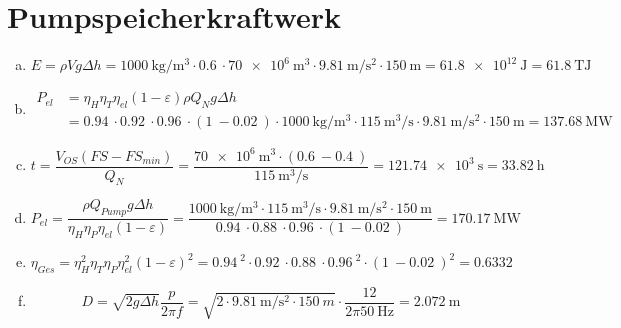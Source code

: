 ﻿\documentclass[a4paper,11pt]{scrartcl}
\newcommand{\mybr}[1]{\left(#1\right)}
\newcommand{\0}{_{\mybr{0}}}
\newcommand{\1}{_{\mybr{1}}}
\newcommand{\2}{_{\mybr{2}}}
\begin{document}
\section{Pumpspeicherkraftwerk}
\begin{enumerate}[a)]
\item
\begin{equation}
E=\rho V g \Delta h=\SI{1000}{\kilo\gram\per\cubic\metre}\cdot\SI{0,6}{}\cdot\SI{70e6}{\cubic\metre}\cdot\SI{9,81}{\metre\per\square\second}\cdot\SI{150}{\metre}=\SI{61,8e12}{\joule}=\SI{61,8}{\tera\joule}
\end{equation}
\item
\begin{align}
P_{el}&=\eta_H\eta_T\eta_{el}\mybr{1-\varepsilon}\rho Q_N g \Delta h\\
&=\SI{0,94}{}\cdot\SI{0,92}{}\cdot\SI{0,96}{}\cdot\mybr{\SI{1}{}-\SI{0,02}{}}\cdot\SI{1000}{\kilo\gram\per\cubic\metre}\cdot\SI{115}{\cubic\metre\per\second}\cdot\SI{9,81}{\metre\per\square\second}\cdot\SI{150}{\metre}=\SI{137,68}{\mega\watt}
\end{align}
\item
\begin{equation}
t=\frac{V_{OS}\mybr{FS-FS_{min}}}{Q_N}=\frac{\SI{70e6}{\cubic\metre}\cdot\mybr{\SI{0,6}{}-\SI{0,4}{}}}{\SI{115}{\cubic\metre\per\second}}=\SI{121,74e3}{\second}=\SI{33,82}{\hour}
\end{equation}
\item
\begin{equation}
P_{el}=\frac{\rho Q_{Pump} g \Delta h}{\eta_H\eta_P\eta_{el}\mybr{1-\varepsilon}}=\frac{\SI{1000}{\kilo\gram\per\cubic\metre}\cdot\SI{115}{\cubic\metre\per\second}\cdot\SI{9,81}{\metre\per\square\second}\cdot\SI{150}{\metre}}{\SI{0,94}{}\cdot\SI{0,88}{}\cdot\SI{0,96}{}\cdot\mybr{\SI{1}{}-\SI{0,02}{}}}=\SI{170,17}{\mega\watt}
\end{equation}
\item
\begin{equation}
\eta_{Ges}=\eta_H^2\eta_T\eta_P\eta_{el}^2\mybr{1-\varepsilon}^2=\SI{0,94}{}^2\cdot\SI{0,92}{}\cdot\SI{0,88}{}\cdot\SI{0,96}{}^2\cdot\mybr{\SI{1}{}-\SI{0,02}{}}^2=\SI{0,6332}{}
\end{equation}
\item
\begin{equation}
D=\sqrt{2 g \Delta h}\frac{p}{2\pi f}=\sqrt{2\cdot\SI{9,81}{\metre\per\square\second}\cdot\SI{150}{m}}\cdot\frac{12}{2\pi\SI{50}{\hertz}}=\SI{2,072}{\metre}
\end{equation}
\end{enumerate}
\setcounter{section}{2}
\end{document}
